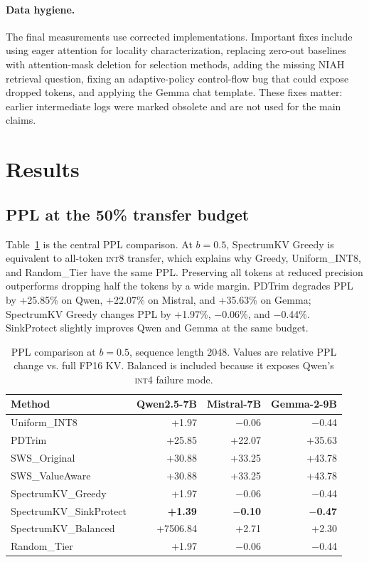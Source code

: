 \documentclass[11pt]{article}
\newcommand{\method}{SpectrumKV}
\newcommand{\niah}{NIAH}
\newcommand{\budget}{b}
\newcommand{\pct}{\%}
\newcommand{\intviii}{\textsc{int8}}
\newcommand{\intiv}{\textsc{int4}}
\theoremstyle{plain}
\theoremstyle{definition}
\begin{document}
\paragraph{Data hygiene.}
The final measurements use corrected implementations.  Important fixes include using eager attention for locality characterization, replacing zero-out baselines with attention-mask deletion for selection methods, adding the missing \niah{} retrieval question, fixing an adaptive-policy control-flow bug that could expose dropped tokens, and applying the Gemma chat template.  These fixes matter: earlier intermediate logs were marked obsolete and are not used for the main claims.

\section{Results}
\label{sec:results}

\subsection{PPL at the 50\pct{} transfer budget}
\label{sec:rq7}

Table~\ref{tab:ppl50} is the central PPL comparison.  At $\budget=0.5$, \method{} Greedy is equivalent to all-token \intviii{} transfer, which explains why Greedy, Uniform\_INT8, and Random\_Tier have the same PPL.  Preserving all tokens at reduced precision outperforms dropping half the tokens by a wide margin.  PDTrim degrades PPL by +25.85\pct{} on Qwen, +22.07\pct{} on Mistral, and +35.63\pct{} on Gemma; \method{} Greedy changes PPL by +1.97\pct{}, $-$0.06\pct{}, and $-$0.44\pct{}.  SinkProtect slightly improves Qwen and Gemma at the same budget.

\begin{table}[t]
\centering
\caption{PPL comparison at $\budget=0.5$, sequence length 2048.  Values are relative PPL change vs. full FP16 KV.  Balanced is included because it exposes Qwen's \intiv{} failure mode.}
\label{tab:ppl50}
\small
\begin{tabular}{lrrr}
\toprule
Method & Qwen2.5-7B & Mistral-7B & Gemma-2-9B \\
\midrule
Uniform\_INT8 & +1.97 & $-$0.06 & $-$0.44 \\
PDTrim & +25.85 & +22.07 & +35.63 \\
SWS\_Original & +30.88 & +33.25 & +43.78 \\
SWS\_ValueAware & +30.88 & +33.25 & +43.78 \\
\method{}\_Greedy & +1.97 & $-$0.06 & $-$0.44 \\
\method{}\_SinkProtect & \textbf{+1.39} & \textbf{$-$0.10} & \textbf{$-$0.47} \\
\method{}\_Balanced & +7506.84 & +2.71 & +2.30 \\
Random\_Tier & +1.97 & $-$0.06 & $-$0.44 \\
\bottomrule
\end{tabular}
\end{table}
\end{document}

